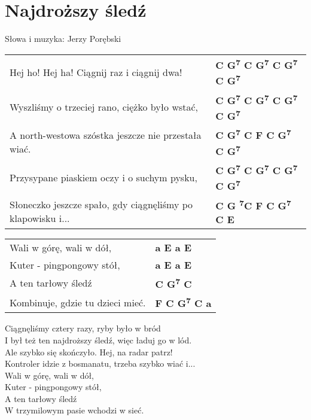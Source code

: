 \section{Najdroższy śledź}

Słowa i muzyka: Jerzy Porębski

\vspace{2em}
\begin{tabular}{@{}p{9cm}@{}l@{}}
Hej ho! Hej ha! Ciągnij raz i ciągnij dwa! & \bfseries C G\textsuperscript{7} C G\textsuperscript{7} C G\textsuperscript{7} C G\textsuperscript{7}\\
Wyszliśmy o trzeciej rano, ciężko było wstać, & \bfseries C G\textsuperscript{7} C G\textsuperscript{7} C G\textsuperscript{7} C G\textsuperscript{7}\\
A north-westowa szóstka jeszcze nie przestała wiać. & \bfseries C G\textsuperscript{7} C F C G\textsuperscript{7} C G\textsuperscript{7}\\
Przysypane piaskiem oczy i o suchym pysku, & \bfseries C G\textsuperscript{7} C G\textsuperscript{7} C G\textsuperscript{7} C G\textsuperscript{7}\\
Słoneczko jeszcze spało, gdy ciągnęliśmy po klapowisku i... & \bfseries C G \textsuperscript{7}C F C G\textsuperscript{7} C E\\
\end{tabular}

\vspace{1em}
\begin{tabular}{@{}p{9cm}@{}l@{}}
Wali w górę, wali w dół, & \bfseries a E a E\\
Kuter - pingpongowy stół, & \bfseries a E a E\\
A ten tarłowy śledź & \bfseries C G\textsuperscript{7} C\\
Kombinuje, gdzie tu dzieci mieć. & \bfseries F C G\textsuperscript{7} C a\\
\end{tabular}

\vspace{1em}
Ciągnęliśmy cztery razy, ryby było w bród \\
I był też ten najdroższy śledź, więc ładuj go w lód. \\
Ale szybko się skończyło. Hej, na radar patrz! \\
Kontroler idzie z bosmanatu, trzeba szybko wiać i... \\

Wali w górę, wali w dół, \\
Kuter - pingpongowy stół, \\
A ten tarłowy śledź \\
W trzymilowym pasie wchodzi w sieć. \\

